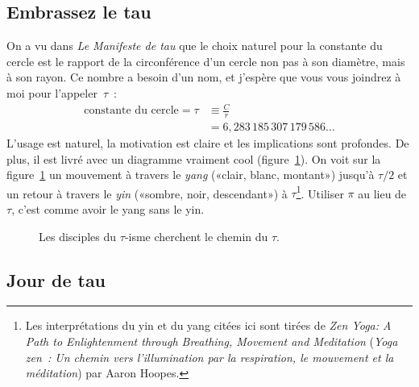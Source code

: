 
  \subsection{Embrassez le tau} %
  \label{sec:embrace_the_tau}

On a vu dans \emph{Le Manifeste de tau} que le choix naturel pour la constante
du cercle est le rapport de la circonférence d'un cercle non pas à son diamètre,
mais à son rayon. Ce nombre a besoin d'un nom, et j'espère que vous vous
joindrez à moi pour l'appeler~$\tau$~:
\[
\begin{split}
\mbox{constante du cercle} = \tau & \equiv \frac{C}{r} \\
                                  & = 6{,}283\,185\,307\,179\,586\ldots
\end{split}
\]
L'usage est naturel, la motivation est claire et les implications sont
profondes. De plus, il est livré avec un diagramme vraiment cool
(figure~\ref{fig:tauism}). On voit sur la figure~\ref{fig:tauism} un mouvement à
travers le \emph{yang} («\ns clair, blanc, montant\ns ») jusqu'à $\tau/2$ et un
retour à travers le \emph{yin} («\ns sombre, noir, descendant\ns ») à
$\tau$\ns\footnote{Les interprétations du yin et du yang citées ici sont tirées
de \emph{Zen Yoga: A Path to Enlightenment through Breathing, Movement and
Meditation} (\emph{Yoga zen~: Un chemin vers l'illumination par la respiration,
le mouvement et la méditation}) par Aaron Hoopes.}. Utiliser $\pi$ au lieu de
$\tau$, c'est comme avoir le yang sans le yin.

\begin{figure}
\begin{center}
\end{center}
\caption{Les disciples du $\tau$-isme cherchent le chemin du
$\tau$.\label{fig:tauism}}
\end{figure}



  \subsection{Jour de tau} %
  \label{sec:tau_day}

